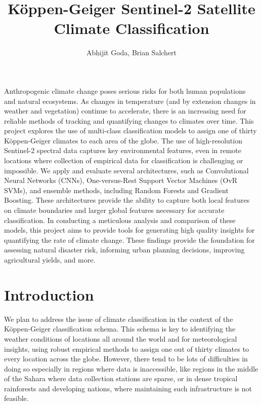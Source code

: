 \documentclass[12pt]{article}
\title{Köppen-Geiger Sentinel-2 Satellite Climate Classification}
\author{Abhijit Goda, Brian Salchert}
\date{}
\begin{document}
\maketitle

\abstract

Anthropogenic climate change poses serious risks for both human populations and natural ecosystems.
As changes in temperature (and by extension changes in weather and vegetation) continue to accelerate, there is an increasing need for reliable methods of tracking and quantifying changes to climates over time.
This project explores the use of multi-class classification models to assign one of thirty Köppen-Geiger climates to each area of the globe.
The use of high-resolution Sentinel-2 spectral data captures key environmental features, even in remote locations where collection of empirical data for classification is challenging or impossible.
We apply and evaluate several architectures, such as Convolutional Neural Networks (CNNs), One-versus-Rest Support Vector Machines (OvR SVMs), and ensemble methods, including Random Forests and Gradient Boosting.
These architectures provide the ability to capture both local features on climate boundaries and larger global features necessary for accurate classification.
In conducting a meticulous analysis and comparison of these models, this project aims to provide tools for generating high quality insights for quantifying the rate of climate change.
These findings provide the foundation for assessing natural disaster risk, informing urban planning decisions, improving agricultural yields, and more.

\section{Introduction}
\label{sec:introduction}

\indent We plan to address the issue of climate classification in the context of the Köppen-Geiger classification schema. This schema is key to identifying the weather conditions of locations all around the world and for meteorological insights, using robust empirical methods to assign one out of thirty climates to every location across the globe. However, there tend to be lots of difficulties in doing so especially in regions where data is inaccessible, like regions in the middle of the Sahara where data collection stations are sparse, or in dense tropical rainforests and developing nations, where maintaining such infrastructure is not feasible.
\end{document}
